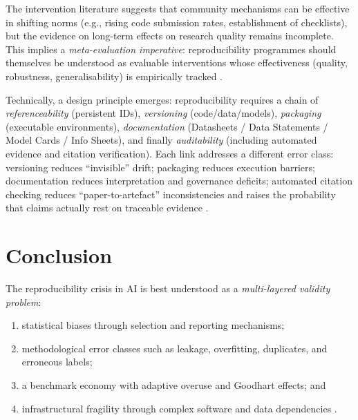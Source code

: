 \documentclass[12pt, a4paper]{article}
\begin{document}
The intervention literature suggests that community mechanisms can be
effective in shifting norms (e.g., rising code submission rates,
establishment of checklists), but the evidence on long-term effects on
research quality remains incomplete.  This implies a \emph{meta-evaluation
imperative}: reproducibility programmes should themselves be understood
as evaluable interventions whose effectiveness (quality, robustness,
generalisability) is empirically tracked \cite{Pineau2021}.

Technically, a design principle emerges: reproducibility requires a
chain of \emph{referenceability} (persistent IDs), \emph{versioning}
(code/data/models), \emph{packaging} (executable environments),
\emph{documentation} (Datasheets / Data Statements / Model Cards / Info
Sheets), and finally \emph{auditability} (including automated evidence
and citation verification).  Each link addresses a different error
class: versioning reduces ``invisible'' drift; packaging reduces
execution barriers; documentation reduces interpretation and governance
deficits; automated citation checking reduces ``paper-to-artefact''
inconsistencies and raises the probability that claims actually rest on
traceable evidence \cite{Halchenko2021,SoilandReyes2022}.

\section{Conclusion}
\label{sec:conclusion}

The reproducibility crisis in AI is best understood as a
\emph{multi-layered validity problem}:
\begin{enumerate}[label=(\roman*), leftmargin=*]
  \item statistical biases through selection and reporting mechanisms;
  \item methodological error classes such as leakage, overfitting,
        duplicates, and erroneous labels;
  \item a benchmark economy with adaptive overuse and Goodhart effects;
        and
  \item infrastructural fragility through complex software and data
        dependencies \cite{Kapoor2023}.
\end{enumerate}
\end{document}
